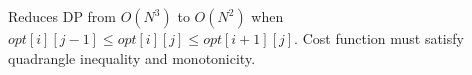 
Reduces DP from $O(N^3)$ to $O(N^2)$ when $opt[i][j-1] \le opt[i][j] \le opt[i+1][j]$. Cost function must satisfy quadrangle inequality and monotonicity.


